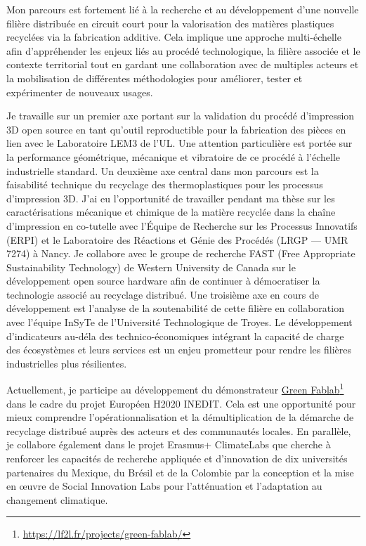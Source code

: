 \documentclass[
  12pt,
  oneside]{book}
\begin{document}
Mon parcours est fortement lié à la recherche et au développement d'une nouvelle filière distribuée en circuit court pour la valorisation des matières plastiques recyclées via la fabrication additive. Cela implique une approche multi-échelle afin d'appréhender les enjeux liés au procédé technologique, la filière associée et le contexte territorial tout en gardant une collaboration avec de multiples acteurs et la mobilisation de différentes méthodologies pour améliorer, tester et expérimenter de nouveaux usages.

Je travaille sur un premier axe portant sur la validation du procédé d'impression 3D open source en tant qu'outil reproductible pour la fabrication des pièces en lien avec le Laboratoire LEM3 de l'UL. Une attention particulière est portée sur la performance géométrique, mécanique et vibratoire de ce procédé à l'échelle industrielle standard.
Un deuxième axe central dans mon parcours est la faisabilité technique du recyclage des thermoplastiques pour les processus d'impression 3D. J'ai eu l'opportunité de travailler pendant ma thèse sur les caractérisations mécanique et chimique de la matière recyclée dans la chaîne d'impression en co-tutelle avec l'Équipe de Recherche sur les Processus Innovatifs (ERPI) et le Laboratoire des Réactions et Génie des Procédés (LRGP --- UMR 7274) à Nancy.
Je collabore avec le groupe de recherche FAST (Free Appropriate Sustainability Technology) de Western University de Canada sur le développement open source hardware afin de continuer à démocratiser la technologie associé au recyclage distribué.
Une troisième axe en cours de développement est l'analyse de la soutenabilité de cette filière en collaboration avec l'équipe InSyTe de l'Université Technologique de Troyes.
Le développement d'indicateurs au-déla des technico-économiques intégrant la capacité de charge des écosystèmes et leurs services est un enjeu prometteur pour rendre les filières industrielles plus résilientes.

Actuellement, je participe au développement du démonstrateur \href{https://lf2l.fr/projects/green-fablab/}{Green Fablab}\footnote{\url{https://lf2l.fr/projects/green-fablab/}} dans le cadre du projet Européen H2020 INEDIT.
Cela est une opportunité pour mieux comprendre l'opérationnalisation et la démultiplication de la démarche de recyclage distribué auprès des acteurs et des communautés locales.
En parallèle, je collabore également dans le projet Erasmus+ ClimateLabs que cherche à renforcer les capacités de recherche appliquée et d'innovation de dix universités partenaires du Mexique, du Brésil et de la Colombie par la conception et la mise en œuvre de Social Innovation Labs pour l'atténuation et l'adaptation au changement climatique.
\end{document}
